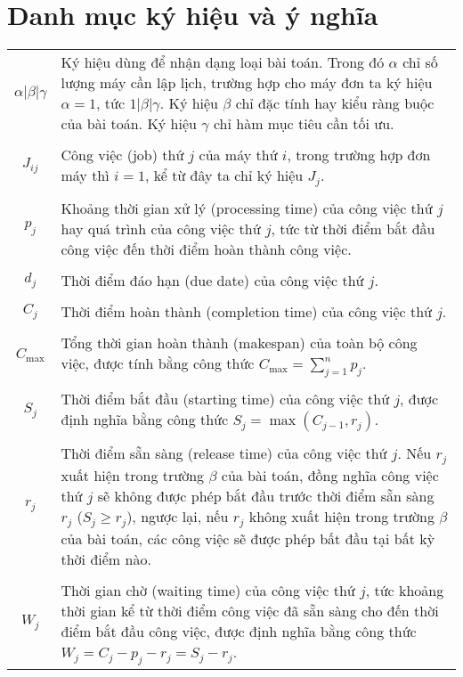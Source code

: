 \documentclass[12pt,a4paper]{report}
\begin{document}
	\chapter*{Danh mục ký hiệu và ý nghĩa}
	\thispagestyle{fancy}
	\begin{tabularx}{\linewidth}{ c  X }
		$\alpha | \beta | \gamma$ & Ký hiệu dùng để nhận dạng loại bài toán. Trong đó $\alpha$ chỉ số lượng máy cần lập lịch, trường hợp cho máy đơn ta ký hiệu $\alpha = 1$, tức $1| \beta | \gamma$. Ký hiệu $\beta$ chỉ đặc tính hay kiểu ràng buộc của bài toán. Ký hiệu $\gamma$ chỉ hàm mục tiêu cần tối ưu. \\
		\\
		$J_{ij}$ & Công việc (job) thứ $j$ của máy thứ $i$, trong trường hợp đơn máy thì $i=1$, kể từ đây ta chỉ ký hiệu $J_j$. \\
		\\
		$p_j$ & Khoảng thời gian xử lý (processing time) của công việc thứ $j$ hay quá trình của công việc thứ $j$, tức từ thời điểm bắt đầu công việc đến thời điểm hoàn thành công việc. \\
		\\
		$d_j$ & Thời điểm đáo hạn (due date) của công việc thứ $j$. \\
		\\
		$C_j$ & Thời điểm hoàn thành (completion time) của công việc thứ $j$. \\
		\\
		$C_{\max}$ & Tổng thời gian hoàn thành (makespan) của toàn bộ công việc, được tính bằng công thức $C_{\max} = \sum_{j=1}^n p_j$. \\
		\\
		$S_j$ & Thời điểm bắt đầu (starting time) của công việc thứ $j$, được định nghĩa bằng công thức $S_j = \max (C_{j-1}, r_j)$. \\
		\\
		$r_j$ & Thời điểm sẵn sàng (release time) của công việc thứ $j$. Nếu $r_j$ xuất hiện trong trường $\beta$ của bài toán, đồng nghĩa công việc thứ $j$ sẽ không được phép bắt đầu trước thời điểm sẵn sàng $r_j$ ($S_j \geq r_j$), ngược lại, nếu $r_j$ không xuất hiện trong trường $\beta$ của bài toán, các công việc sẽ được phép bất đầu tại bất kỳ thời điểm nào. \\
		\\
		$W_j$ & Thời gian chờ (waiting time) của công việc thứ $j$, tức khoảng thời gian kể từ thời điểm công việc đã sẵn sàng cho đến thời điểm bắt đầu công việc, được định nghĩa bằng công thức $W_j = C_j - p_j - r_j = S_j - r_j$. \\

\end{tabularx}
\end{document}
